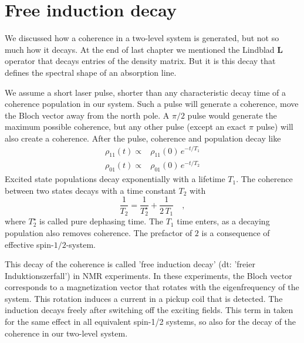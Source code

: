 \section{Free induction decay}

We discussed how a coherence in a two-level system is generated, but not so much how it decays. At the end of last chapter we mentioned the Lindblad $\boldsymbol{L}  $ operator that decays entries of the density matrix. But it is this decay that defines the spectral shape of an absorption line.

We assume a short laser pulse, shorter than any characteristic decay time of a coherence population in our system. Such a pulse will generate a coherence, move the Bloch vector away from the north pole. A $\pi/2$ pulse would generate the maximum possible coherence, but any other pulse (except an exact $\pi$ pulse) will also create a coherence. After the pulse,  coherence  and population decay like
\begin{align}
 \rho_{11}(t) \propto & \rho_{11}(0)  \, e^{- t / T_1} \\
 \rho_{01}(t) \propto & \rho_{01}(0)  \, e^{- t / T_2} 
\end{align}
Excited state populations decay exponentially with a lifetime $T_1$. The coherence between two states decays with a time constant $T_2$ with
\begin{equation}
    \frac{1}{T_2} = \frac{1}{T_2^\star} + \frac{1}{2 \, T_1} \quad ,
\end{equation}
where $T_2^\star$ is called pure dephasing time. The $T_1$ time enters, as a decaying population also removes coherence. The prefactor of $2$ is a consequence of effective spin-$1/2$-system.

This decay of the coherence is called 'free induction decay' (dt: 'freier Induktionszerfall') in NMR experiments. In these experiments, the Bloch vector corresponds to a magnetization vector that rotates with the eigenfrequency of the system. This rotation induces a current in a pickup coil that is detected. The induction decays freely after switching off the exciting fields. This term in taken for the same effect in all equivalent spin-1/2 systems, so also for the decay of the coherence in our two-level system.

